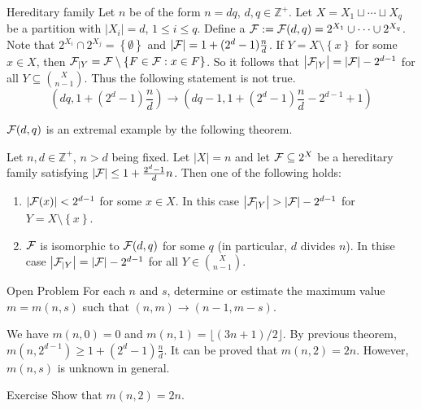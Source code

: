 \begin{definition}[def:]{Hereditary family}
    Let $n$ be of the form $n=dq$, $d,q\in \mathbb{Z}^+$. Let $X=X_1\sqcup\cdots \sqcup X_q$ be a partition with $\left|X_i\right|=d$, $1\leq i\leq q$. Define a  $\mathcal{F}:=\mathcal{F}(d,q)=2^{X_1}\cup \cdots \cup 2^{X_q}$. Note that $2^{X_i}\cap 2^{X_j}=\left\{\emptyset \right\}$ and $\left|\mathcal{F}\right|=1+(2^{d}-1)\frac{n}{d}$. If $Y=X\setminus \left\{x\right\}$ for some $x\in X$, then $\mathcal{F}_{|Y}=\mathcal{F}\setminus \left\{F\in \mathcal{F}:x\in F\right\}$. So it follows that $\left|\mathcal{F}_{|Y}\right|=\left|\mathcal{F}\right|-2^{d-1}$ for all $Y\subseteq {X\choose n-1}$. Thus the following statement is not true.
    \[(dq,1+(2^d-1)\frac{n}{d})\rightarrow (dq-1,1+(2^d-1)\frac{n}{d}-2^{d-1}+1)\]
\end{definition}

\begin{remark}
    $\mathcal{F}(d,q)$ is an extremal example by the following theorem.
\end{remark}

\begin{theorem}[thm:]{}
    Let $n,d\in \mathbb{Z}^+$, $n>d$ being fixed. Let $\left|X\right|=n$ and let $\mathcal{F}\subseteq 2^{X}$ be a hereditary family satisfying $\left|\mathcal{F}\right|\leq 1+\frac{2^d-1}{d}n$. Then one of the following holds:
    \begin{enumerate}
        \item $\left|\mathcal{F}(x)\right|<2^{d-1}$ for some $x\in X$. In this case $\left|\FF_{|Y}\right|>\left|\FF\right|-2^{d-1}$ for $Y=X\setminus \left\{x\right\}$.
        \item $\mathcal{F}$ is isomorphic to $\mathcal{F}(d,q)$ for some $q$ (in particular, $d$ divides $n$). In thise case $\left|\mathcal{F}_{|Y}\right|=\left|\mathcal{F}\right|-2^{d-1}$ for all $Y\in {X\choose n-1}$.
    \end{enumerate}
\end{theorem}

\begin{newenv}[rnd:]{}{Open Problem}
    For each $n$ and $s$, determine or estimate the maximum value $m=m(n,s)$ such that $(n,m)\rightarrow (n-1,m-s)$.
\end{newenv}

\begin{remark}
    We have $m(n,0)=0$ and $m(n,1)=\lfloor (3n+1)/2\rfloor$. By previous theorem, $m(n,2^{d-1})\geq 1+(2^d-1)\frac{n}{d}$. It can be proved that $m(n,2)=2n$. However, $m(n,s)$ is unknown in general.
\end{remark}

\begin{newenv}[rnd:]{}{Exercise}
    Show that $m(n,2)=2n$.
\end{newenv}

